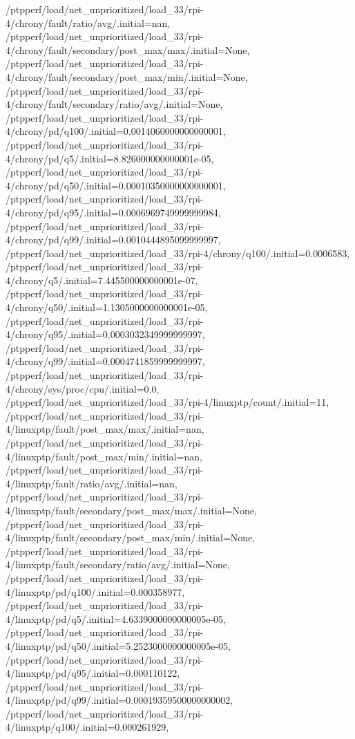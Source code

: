 {    /ptpperf/load/net_unprioritized/load_33/rpi-4/chrony/fault/ratio/avg/.initial=nan,
    /ptpperf/load/net_unprioritized/load_33/rpi-4/chrony/fault/secondary/post_max/max/.initial=None,
    /ptpperf/load/net_unprioritized/load_33/rpi-4/chrony/fault/secondary/post_max/min/.initial=None,
    /ptpperf/load/net_unprioritized/load_33/rpi-4/chrony/fault/secondary/ratio/avg/.initial=None,
    /ptpperf/load/net_unprioritized/load_33/rpi-4/chrony/pd/q100/.initial=0.0014060000000000001,
    /ptpperf/load/net_unprioritized/load_33/rpi-4/chrony/pd/q5/.initial=8.826000000000001e-05,
    /ptpperf/load/net_unprioritized/load_33/rpi-4/chrony/pd/q50/.initial=0.00010350000000000001,
    /ptpperf/load/net_unprioritized/load_33/rpi-4/chrony/pd/q95/.initial=0.0006969749999999984,
    /ptpperf/load/net_unprioritized/load_33/rpi-4/chrony/pd/q99/.initial=0.0010444895099999997,
    /ptpperf/load/net_unprioritized/load_33/rpi-4/chrony/q100/.initial=0.0006583,
    /ptpperf/load/net_unprioritized/load_33/rpi-4/chrony/q5/.initial=7.445500000000001e-07,
    /ptpperf/load/net_unprioritized/load_33/rpi-4/chrony/q50/.initial=1.1305000000000001e-05,
    /ptpperf/load/net_unprioritized/load_33/rpi-4/chrony/q95/.initial=0.0003032349999999997,
    /ptpperf/load/net_unprioritized/load_33/rpi-4/chrony/q99/.initial=0.0004741859999999997,
    /ptpperf/load/net_unprioritized/load_33/rpi-4/chrony/sys/proc/cpu/.initial=0.0,
    /ptpperf/load/net_unprioritized/load_33/rpi-4/linuxptp/count/.initial=11,
    /ptpperf/load/net_unprioritized/load_33/rpi-4/linuxptp/fault/post_max/max/.initial=nan,
    /ptpperf/load/net_unprioritized/load_33/rpi-4/linuxptp/fault/post_max/min/.initial=nan,
    /ptpperf/load/net_unprioritized/load_33/rpi-4/linuxptp/fault/ratio/avg/.initial=nan,
    /ptpperf/load/net_unprioritized/load_33/rpi-4/linuxptp/fault/secondary/post_max/max/.initial=None,
    /ptpperf/load/net_unprioritized/load_33/rpi-4/linuxptp/fault/secondary/post_max/min/.initial=None,
    /ptpperf/load/net_unprioritized/load_33/rpi-4/linuxptp/fault/secondary/ratio/avg/.initial=None,
    /ptpperf/load/net_unprioritized/load_33/rpi-4/linuxptp/pd/q100/.initial=0.000358977,
    /ptpperf/load/net_unprioritized/load_33/rpi-4/linuxptp/pd/q5/.initial=4.6339000000000005e-05,
    /ptpperf/load/net_unprioritized/load_33/rpi-4/linuxptp/pd/q50/.initial=5.2523000000000005e-05,
    /ptpperf/load/net_unprioritized/load_33/rpi-4/linuxptp/pd/q95/.initial=0.000110122,
    /ptpperf/load/net_unprioritized/load_33/rpi-4/linuxptp/pd/q99/.initial=0.00019359500000000002,
    /ptpperf/load/net_unprioritized/load_33/rpi-4/linuxptp/q100/.initial=0.000261929,
}
